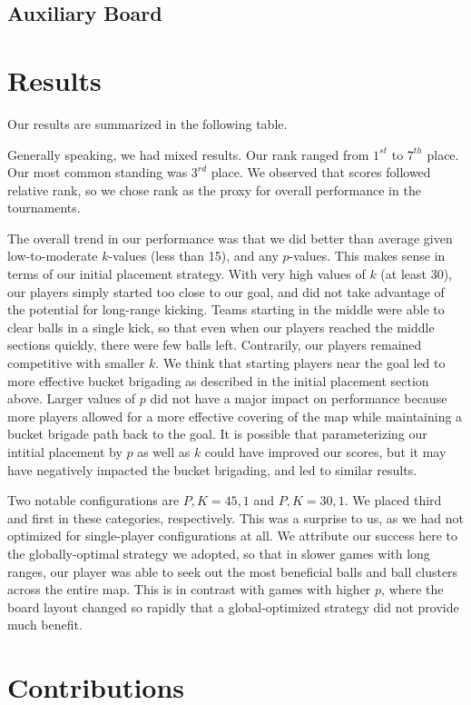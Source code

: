 \documentclass[
10pt, %
letterpaper, %
oneside, %
headinclude,footinclude, %
english
]{article}
\begin{document}
\subsection {Auxiliary Board}

\section{Results}
Our results are summarized in the following table.

Generally speaking, we had mixed results. Our rank ranged from $1^{st}$ to $7^{th}$ place. Our most common standing was $3^{rd}$ place. We observed that scores followed relative rank, so we chose rank as the proxy for overall performance in the tournaments.

The overall trend in our performance was that we did better than average given low-to-moderate $k$-values (less than 15), and any $p$-values. This makes sense in terms of our initial placement strategy. With very high values of $k$ (at least 30), our players simply started too close to our goal, and did not take advantage of the potential for long-range kicking. Teams starting in the middle were able to clear balls in a single kick, so that even when our players reached the middle sections quickly, there were few balls left. Contrarily, our players remained competitive with smaller $k$. We think that starting players near the goal led to more effective bucket brigading as described in the initial placement section above. Larger values of $p$ did not have a major impact on performance because more players allowed for a more effective covering of the map while maintaining a bucket brigade path back to the goal. It is possible that parameterizing our intitial placement by $p$ as well as $k$ could have improved our scores, but it may have negatively impacted the bucket brigading, and led to similar results.

Two notable configurations are $P,K=45,1$ and $P,K=30,1$. We placed third and first in these categories, respectively. This was a surprise to us, as we had not optimized for single-player configurations at all. We attribute our success here to the globally-optimal strategy we adopted, so that in slower games with long ranges, our player was able to seek out the most beneficial balls and ball clusters across the entire map. This is in contrast with games with higher $p$, where the board layout changed so rapidly that a global-optimized strategy did not provide much benefit. 


\section{Contributions}
\end{document}
